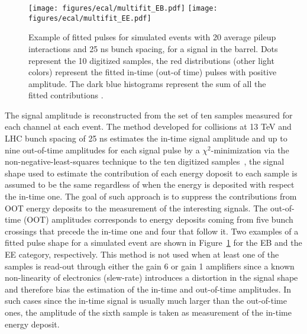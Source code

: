 \begin{figure}[!h]
  \centering
  \texttt{[image: figures/ecal/multifit\_EB.pdf]}
  \texttt{[image: figures/ecal/multifit\_EE.pdf]}
  \caption{Example of fitted pulses for simulated events with 20 average pileup interactions and 25 ns bunch spacing, for a signal in the barrel. Dots represent the 10 digitized samples, the red distributions (other light colors) represent the fitted in-time (out-of time) pulses with positive amplitude. The dark blue histograms represent the sum of all the fitted contributions \cite{Multifit}.}
  \label{fig:multifit_for_dummies}
\end{figure}


The signal amplitude is reconstructed from the set of ten samples measured for each channel at each event.
The method developed for collisions at 13 TeV and LHC bunch spacing of 25 ns estimates
the in-time signal amplitude and up to nine out-of-time
amplitudes for each signal pulse by a $\chi^2$-minimization via the non-negative-least-squares
technique to the ten digitized samples~\cite{Multifit}, the signal shape used to estimate the contribution of each
energy doposit to each sample is assumed to be the same regardless of when the energy is deposited with respect
the in-time one.
The goal of such approach is to suppress the contributions from OOT energy deposits
to the measurement of the interesting signals.
The out-of-time (OOT) amplitudes corresponds to
energy deposits coming from five bunch crossings that precede the in-time one and four that follow it.
Two examples of a fitted pulse shape for
a simulated event are shown in Figure~\ref{fig:multifit_for_dummies} for the EB and the EE category, respectively.
This method is not used when at least one of the samples is read-out through either the gain 6 or gain 1
amplifiers since a known non-linearity of electronics (slew-rate) introduces a distortion in the signal shape
and therefore bias the estimation of the in-time and out-of-time amplitudes.
In such cases since the in-time signal is usually much larger than the out-of-time ones,
the amplitude of the sixth sample is taken as measurement of the in-time energy deposit.


